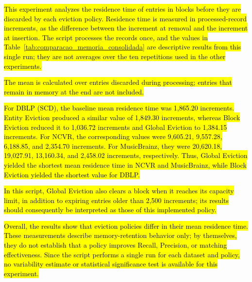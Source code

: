 \documentclass{ieeeaccess}
\begin{document}
\hl{This experiment analyzes the residence time of entries in blocks before they are discarded by each eviction policy. Residence time is measured in processed-record increments, as the difference between the increment at removal and the increment at insertion. The script processes the records once, and the values in Table~\ref{tab:comparacao_memoria_consolidada} are descriptive results from this single run; they are not averages over the ten repetitions used in the other experiments.}

\hl{The mean is calculated over entries discarded during processing; entries that remain in memory at the end are not included.}

\hl{For DBLP (SCD), the baseline mean residence time was 1,865.20 increments. Entity Eviction produced a similar value of 1,849.30 increments, whereas Block Eviction reduced it to 1,036.72 increments and Global Eviction to 1,384.15 increments. For NCVR, the corresponding values were 9,605.21, 9,557.28, 6,188.85, and 2,354.70 increments. For MusicBrainz, they were 20,620.18, 19,027.91, 13,160.34, and 2,458.02 increments, respectively. Thus, Global Eviction yielded the shortest mean residence time in NCVR and MusicBrainz, while Block Eviction yielded the shortest value for DBLP.}

\hl{In this script, Global Eviction also clears a block when it reaches its capacity limit, in addition to expiring entries older than 2,500 increments; its results should consequently be interpreted as those of this implemented policy.}

\hl{Overall, the results show that eviction policies differ in their mean residence time. These measurements describe memory-retention behavior only; by themselves, they do not establish that a policy improves Recall, Precision, or matching effectiveness. Since the script performs a single run for each dataset and policy, no variability estimate or statistical significance test is available for this experiment.}
\end{document}
